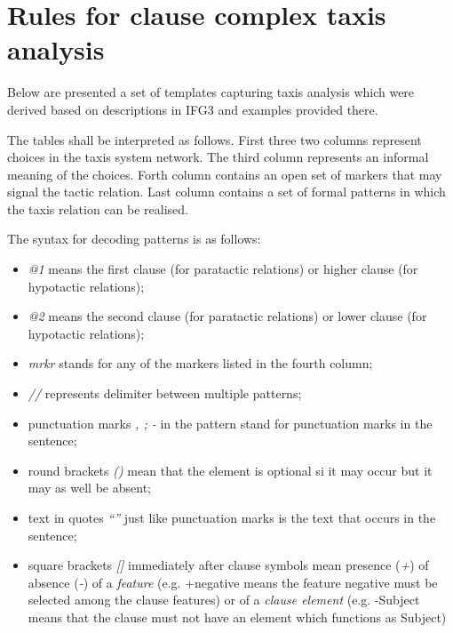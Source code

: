 \chapter{Rules for clause complex taxis analysis}
\label{ch:texis-patterns}
Below are presented a set of templates capturing taxis analysis which were derived based on descriptions in IFG3 \citep{Halliday2004} and examples provided there. 

The tables shall be interpreted as follows. First three two columns represent choices in the taxis system network. The third column represents an informal meaning of the choices. Forth column contains an open set of markers that may signal the tactic relation. Last column contains a set of formal patterns in which the taxis relation can be realised. 

The syntax for decoding patterns is as follows: 
\begin{itemize}
	\item \textit{@1} means the first clause (for paratactic relations) or higher clause (for hypotactic relations); 
	\item \textit{@2} means the second clause (for paratactic relations) or lower clause (for hypotactic relations); 
	\item \textit{mrkr} stands for any of the markers listed in the fourth column;
	\item \textit{//} represents delimiter between multiple patterns;
	\item punctuation marks \textit{, ; -} in the pattern stand for punctuation marks in the sentence;
	\item round brackets \textit{()} mean that the element is optional si it may occur but it may as well be absent;
	\item text in quotes \textit{``''} just like punctuation marks is the text that occurs in the sentence;
	\item square brackets \textit{[]} immediately after clause symbols mean presence (\textit{+}) of absence (\textit{-}) of a \textit{feature} (e.g. +negative means the feature negative must be selected among the clause features) or of a \textit{clause element} (e.g. -Subject means that the clause must not have an element which functions as Subject)
\end{itemize}

	\clearpage%
	
